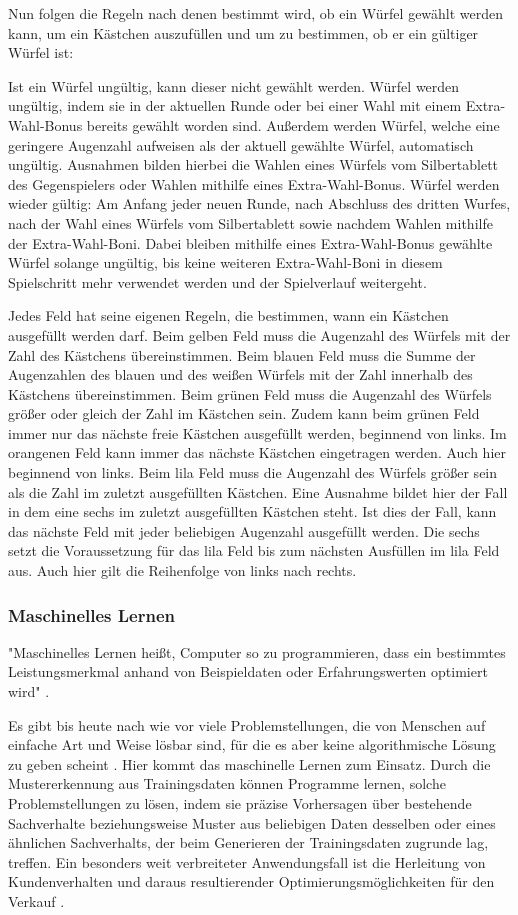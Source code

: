 Nun folgen die Regeln nach denen bestimmt wird, ob ein Würfel gewählt werden kann, um ein Kästchen auszufüllen und um zu bestimmen, ob er ein gültiger Würfel ist:

Ist ein Würfel ungültig, kann dieser nicht gewählt werden. Würfel werden ungültig, indem sie in der aktuellen Runde oder bei einer Wahl mit einem Extra-Wahl-Bonus bereits gewählt worden sind. Außerdem werden Würfel, welche eine geringere Augenzahl aufweisen als der aktuell gewählte Würfel, automatisch ungültig. Ausnahmen bilden hierbei die Wahlen eines Würfels vom Silbertablett des Gegenspielers oder Wahlen mithilfe eines Extra-Wahl-Bonus. Würfel werden wieder gültig: Am Anfang jeder neuen Runde, nach Abschluss des dritten Wurfes, nach der Wahl eines Würfels vom Silbertablett sowie nachdem Wahlen mithilfe der Extra-Wahl-Boni. Dabei bleiben mithilfe eines Extra-Wahl-Bonus gewählte Würfel solange ungültig, bis keine weiteren Extra-Wahl-Boni in diesem Spielschritt mehr verwendet werden und der Spielverlauf weitergeht.

Jedes Feld hat seine eigenen Regeln, die bestimmen, wann ein Kästchen ausgefüllt werden darf. Beim gelben Feld muss die Augenzahl des Würfels mit der Zahl des Kästchens übereinstimmen. Beim blauen Feld muss die Summe der Augenzahlen des blauen und des weißen Würfels mit der Zahl innerhalb des Kästchens übereinstimmen. Beim grünen Feld muss die Augenzahl des Würfels größer oder gleich der Zahl im Kästchen sein. Zudem kann beim grünen Feld immer nur das nächste freie Kästchen ausgefüllt werden, beginnend von links. Im orangenen Feld kann immer das nächste Kästchen eingetragen werden. Auch hier beginnend von links. Beim lila Feld muss die Augenzahl des Würfels größer sein als die Zahl im zuletzt ausgefüllten Kästchen. Eine Ausnahme bildet hier der Fall in dem eine sechs im zuletzt ausgefüllten Kästchen steht. Ist dies der Fall, kann das nächste Feld mit jeder beliebigen Augenzahl ausgefüllt werden. Die sechs setzt die Voraussetzung für das lila Feld bis zum nächsten Ausfüllen im lila Feld aus. Auch hier gilt die Reihenfolge von links nach rechts.
\subsubsection{Maschinelles Lernen}
"Maschinelles Lernen heißt, Computer so zu programmieren, dass ein bestimmtes Leistungsmerkmal anhand von Beispieldaten oder Erfahrungswerten optimiert wird" \cite[S. 3]{alpaydin_maschinelles_2022}.

Es gibt bis heute nach wie vor viele Problemstellungen, die von Menschen auf einfache Art und Weise lösbar sind, für die es aber keine algorithmische Lösung zu geben scheint \cite[S. 1]{alpaydin_maschinelles_2022}. Hier kommt das maschinelle Lernen zum Einsatz. Durch die Mustererkennung aus Trainingsdaten können Programme lernen, solche Problemstellungen zu lösen, indem sie präzise Vorhersagen über bestehende Sachverhalte beziehungsweise Muster aus beliebigen Daten desselben oder eines ähnlichen Sachverhalts, der beim Generieren der Trainingsdaten zugrunde lag, treffen. Ein besonders weit verbreiteter Anwendungsfall ist die Herleitung von Kundenverhalten und daraus resultierender Optimierungsmöglichkeiten für den Verkauf \cite[S. 1f]{alpaydin_maschinelles_2022}. 

